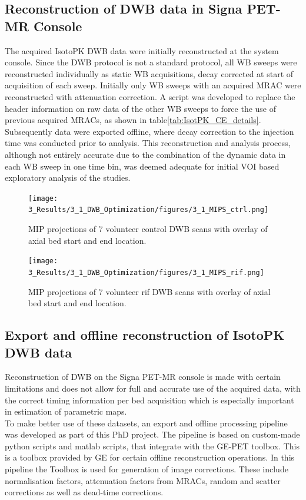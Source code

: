 \subsection{Reconstruction of DWB data in Signa PET-MR Console}
The acquired IsotoPK DWB data were initially reconstructed at the system console. Since the DWB protocol is not a standard protocol, all WB sweeps were reconstructed individually as static WB acquisitions, decay corrected at start of acquisition of each sweep. Initially only WB sweeps with an acquired MRAC were reconstructed with attenuation correction. A script was developed to replace the header information on raw data of the other WB sweeps to force the use of previous acquired MRACs, as shown in table\ref{tab:IsotPK_CE_details}. Subsequently data were exported offline, where decay correction to the injection time was conducted prior to analysis. This reconstruction and analysis process, although not entirely accurate due to the combination of the dynamic data in each WB sweep in one time bin, was deemed adequate for initial VOI based exploratory analysis of the studies.
%
%
\begin{figure} [ht!]
\centering
\texttt{[image: 3\_Results/3\_1\_DWB\_Optimization/figures/3\_1\_MIPS\_ctrl.png]}
\caption{MIP projections of 7 volunteer control DWB scans with overlay of axial bed start and end location.} 
\label{fig3_1:ctrl_mips}
\end{figure}
%
\begin{figure} [ht!]
\centering
\texttt{[image: 3\_Results/3\_1\_DWB\_Optimization/figures/3\_1\_MIPS\_rif.png]}
\caption{MIP projections of 7 volunteer rif DWB scans with overlay of axial bed start and end location.} 
\label{fig3_1:rif_mips}
\end{figure}
%
%
\subsection{Export and offline reconstruction of IsotoPK DWB data}
Reconstruction of DWB on the Signa PET-MR console is made with certain limitations and does not allow for full and accurate use of the acquired data, with the correct timing information per bed acquisition which is especially important in estimation of parametric maps. \\
To make better use of these datasets, an export and offline processing pipeline was developed as part of this PhD project. The pipeline is based on custom-made python scripts and matlab scripts, that integrate with the GE-PET toolbox. This is a toolbox provided by GE for certain offline reconstruction operations. In this pipeline the Toolbox is used for generation of image corrections. These include normalisation factors, attenuation factors from MRACs, random and scatter corrections as well as dead-time corrections. 

